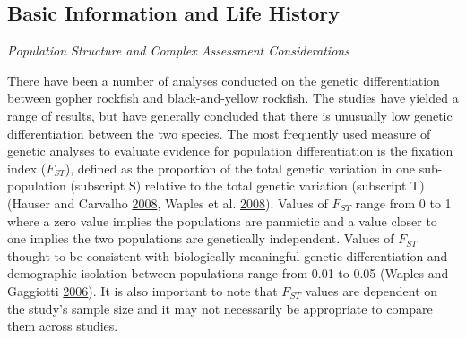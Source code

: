 \documentclass[12pt,]{article}
\begin{document}
\subsection{Basic Information and Life
History}\label{basic-information-and-life-history}

\emph{Population Structure and Complex Assessment Considerations}

There have been a number of analyses conducted on the genetic
differentiation between gopher rockfish and black-and-yellow rockfish.
The studies have yielded a range of results, but have generally
concluded that there is unusually low genetic differentiation between
the two species. The most frequently used measure of genetic analyses to
evaluate evidence for population differentiation is the fixation index
(\(F_{ST}\)), defined as the proportion of the total genetic variation
in one sub-population (subscript S) relative to the total genetic
variation (subscript T) (Hauser and Carvalho
\protect\hyperlink{ref-Hauser2008}{2008}, Waples et al.
\protect\hyperlink{ref-Waples2008}{2008}). Values of \(F_{ST}\) range
from 0 to 1 where a zero value implies the populations are panmictic and
a value closer to one implies the two populations are genetically
independent. Values of \(F_{ST}\) thought to be consistent with
biologically meaningful genetic differentiation and demographic
isolation between populations range from 0.01 to 0.05 (Waples and
Gaggiotti \protect\hyperlink{ref-Waples2006}{2006}). It is also
important to note that \(F_{ST}\) values are dependent on the study's
sample size and it may not necessarily be appropriate to compare them
across studies.
\end{document}
